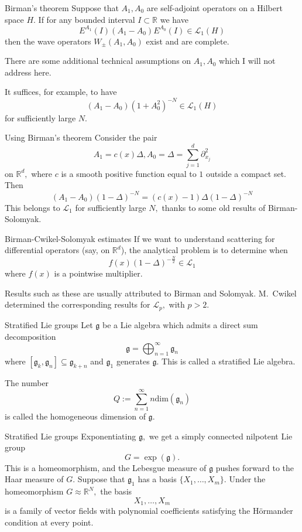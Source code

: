 \documentclass{beamer}
\numberwithin{equation}{section}
\theoremstyle{plain}
\theoremstyle{plain}
\theoremstyle{definition}
\theoremstyle{plain}
\theoremstyle{plain}
\theoremstyle{definition}
\newcommand{\Rl}{\mathbb{R}}
\newcommand{\Lc}{\mathcal{L}}
\newcommand{\gf}{\mathfrak{g}}
\begin{document}
\begin{frame}{Birman's theorem}
  Suppose that $A_1,A_0$ are self-adjoint operators on a Hilbert space $H.$ If for any bounded interval $I\subset \Rl$ we have
  \[
    E^{A_1}(I)(A_1-A_0)E^{A_0}(I) \in \Lc_1(H)
  \]
  then the wave operators $W_{\pm}(A_1,A_0)$ exist and are complete.\\\pause

  {\color{red} There are some additional technical assumptions on $A_1,A_0$ which I will not address here.}\\ \pause

  It suffices, for example, to have
  \[
    (A_1-A_0)(1+A_0^2)^{-N} \in \Lc_1(H)
  \]
  for sufficiently large $N.$
\end{frame}

\begin{frame}{Using Birman's theorem}
  Consider the pair
  \[
      A_1 =c(x)\Delta, A_0 = \Delta = \sum_{j=1}^d \partial_{x_j}^2
  \]
  on $\Rl^d,$ where $c$ is a smooth positive function equal to $1$ outside a compact set. Then
  \[
    (A_1-A_0)(1-\Delta)^{-N} =(c(x)-1)\Delta (1-\Delta)^{-N}
  \]
  This belongs to $\Lc_1$ for sufficiently large $N,$ thanks to some old results of Birman-Solomyak.
\end{frame}

\begin{frame}{Birman-Cwikel-Solomyak estimates}
  If we want to understand scattering for differential operators (say, on $\Rl^d$), the analytical problem is to determine when
  \[
    f(x)(1-\Delta)^{-\frac{N}{2}} \in \Lc_1
  \]
  where $f(x)$ is a pointwise multiplier.

  Results such as these are usually attributed to Birman and Solomyak. M.~Cwikel determined the corresponding results for $\Lc_p,$ with $p>2.$
\end{frame}


\begin{frame}{Stratified Lie groups}
  Let $\gf$ be a Lie algebra which admits a direct sum decomposition
  \[
    \gf = \bigoplus_{n=1}^\infty \gf_n
  \]
  where $[\gf_k,\gf_n] \subseteq \gf_{k+n}$ and $\gf_1$ generates $\gf.$
  This is called a stratified Lie algebra.

  The number
  \[
    Q := \sum_{n=1}^\infty n\mathrm{dim}(\gf_n)
  \]
  is called the homogeneous dimension of $\gf.$
\end{frame}

\begin{frame}{Stratified Lie groups}
  Exponentiating $\gf,$ we get a simply connected nilpotent Lie group
  \[
    G = \exp(\gf).
  \]
  This is a homeomorphism, and the Lebesgue measure of $\gf$ pushes forward to the Haar measure of $G.$
  Suppose that $\gf_1$ has a basis $\{X_1,\ldots,X_m\}.$ Under the homeomorphism $G\approx \Rl^N,$ the basis
  \[
    X_1,\ldots,X_m
  \]
  is a family of vector fields with polynomial coefficients satisfying the H\"ormander condition at every point.
\end{frame}
\end{document}
